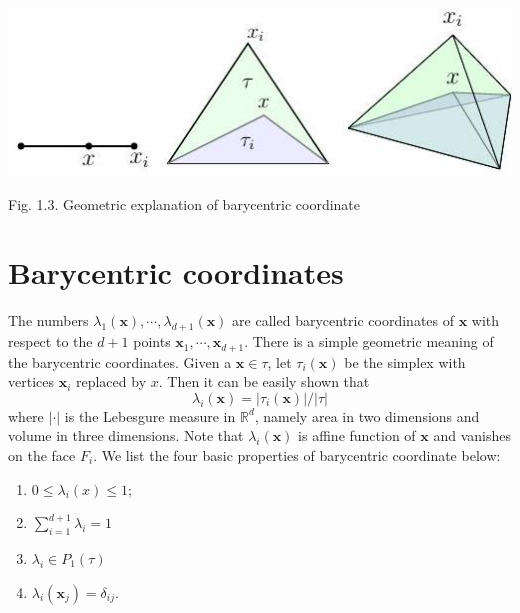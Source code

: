 \documentclass[10pt]{article}
\begin{document}
\includegraphics[max width=\textwidth]{2022_01_05_15c63bf4a948497c30d9g-06}

Fig. 1.3. Geometric explanation of barycentric coordinate

\section{Barycentric coordinates}
The numbers $\lambda_{1}(\boldsymbol{x}), \cdots, \lambda_{d+1}(\boldsymbol{x})$ are called barycentric coordinates of $\boldsymbol{x}$ with respect to the $d+1$ points $\boldsymbol{x}_{1}, \cdots, \boldsymbol{x}_{d+1}$. There is a simple geometric meaning of the barycentric coordinates. Given a $\boldsymbol{x} \in \tau$, let $\tau_{i}(\boldsymbol{x})$ be the simplex with vertices $\boldsymbol{x}_{i}$ replaced by $x$. Then it can be easily shown that
$$
\lambda_{i}(\boldsymbol{x})=\left|\tau_{i}(\boldsymbol{x})\right| /|\tau|
$$
where $|\cdot|$ is the Lebesgure measure in $\mathbb{R}^{d}$, namely area in two dimensions and volume in three dimensions. Note that $\lambda_{i}(\boldsymbol{x})$ is affine function of $\boldsymbol{x}$ and vanishes on the face $F_{i}$. We list the four basic properties of barycentric coordinate below:

    \begin{enumerate}
      \item $0 \leq \lambda_{i}(x) \leq 1$;

      \item $\sum_{i=1}^{d+1} \lambda_{i}=1$

      \item $\lambda_{i} \in P_{1}(\tau)$

      \item $\lambda_{i}\left(\boldsymbol{x}_{j}\right)=\delta_{i j} .$

    \end{enumerate}
\end{document}
